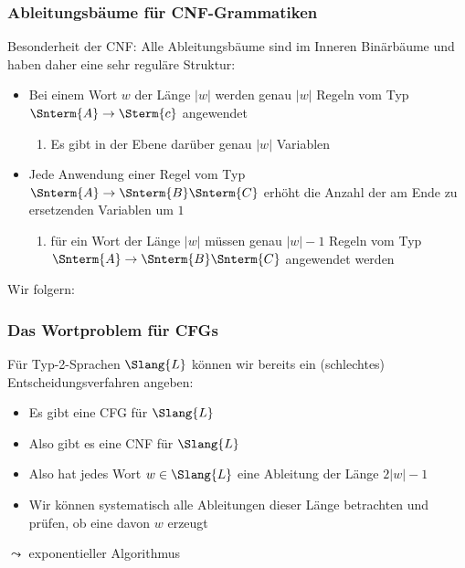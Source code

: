 \documentclass[aspectratio=1610,onlymath]{beamer}
\begin{document}
\begin{frame}\frametitle{Ableitungsbäume für CNF-Grammatiken}

\alert{Besonderheit der CNF:} Alle Ableitungsbäume sind im Inneren Binärbäume und haben daher eine 
sehr reguläre Struktur\pause:
\begin{itemize}
\item Bei einem Wort $w$ der Länge $|w|$ werden genau $|w|$ Regeln vom Typ $\Snterm{A}\to\Sterm{c}$ angewendet\\
\begin{enumerate}[$\leadsto$]
\item Es gibt in der Ebene darüber genau $|w|$ Variablen
\end{enumerate}\pause
\item Jede Anwendung einer Regel vom Typ $\Snterm{A}\to\Snterm{B}\Snterm{C}$ erhöht die Anzahl der am Ende
zu ersetzenden Variablen um $1$
\begin{enumerate}[$\leadsto$]
\item für ein Wort der Länge $|w|$ müssen genau $|w|-1$ Regeln vom Typ $\Snterm{A}\to\Snterm{B}\Snterm{C}$ angewendet werden
\end{enumerate}
\end{itemize}\pause
Wir folgern:


\end{frame}


\begin{frame}\frametitle{Das Wortproblem für CFGs}

\pause

Für Typ-2-Sprachen $\Slang{L}$ können wir bereits ein (schlechtes) Entscheidungsverfahren angeben:
\begin{itemize}
\item Es gibt eine CFG für $\Slang{L}$
\item Also gibt es eine CNF für $\Slang{L}$
\item Also hat jedes Wort $w\in\Slang{L}$ eine Ableitung der Länge $2|w|-1$
\item Wir können systematisch alle Ableitungen dieser Länge betrachten und prüfen, ob eine davon $w$ erzeugt
\end{itemize}\pause
$\leadsto$ exponentieller Algorithmus
\bigskip


\end{frame}
\end{document}

